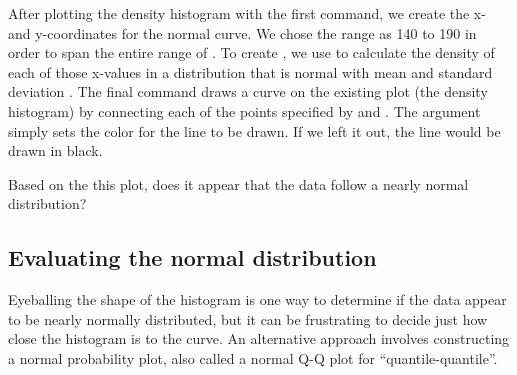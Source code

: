\documentclass[11pt]{article}
\begin{document}
After plotting the density histogram with the first command, we create the x- and y-coordinates for the normal curve.  We chose the \texttt{} range as 140 to 190 in order to span the entire range of \texttt{}.  To create \texttt{}, we use \texttt{} to calculate the density of each of those x-values in a distribution that is normal with mean \texttt{} and standard deviation \texttt{}.  The final command draws a curve on the existing plot (the density histogram) by connecting each of the points specified by \texttt{} and \texttt{}. The argument \texttt{} simply sets the color for the line to be drawn. If we left it out, the line would be drawn in black.

\begin{exercise}
Based on the this plot, does it appear that the data follow a nearly normal distribution?
\end{exercise}

%

\subsection*{Evaluating the normal distribution}
Eyeballing the shape of the histogram is one way to determine if the data appear to be nearly normally distributed, but it can be frustrating to decide just how close the histogram is to the curve. An alternative approach involves constructing a normal probability plot, also called a normal Q-Q plot for ``quantile-quantile''.

\ttfamily\noindent
\hlstd{}\hspace*{\fill}\\
\hlstd{}\hlkeyword{(}\hlkeyword{)}\hspace*{\fill}\\
\hlstd{}\hlkeyword{(}\hlkeyword{)}\hspace*{\fill}\\
\normalfont
\end{document}
